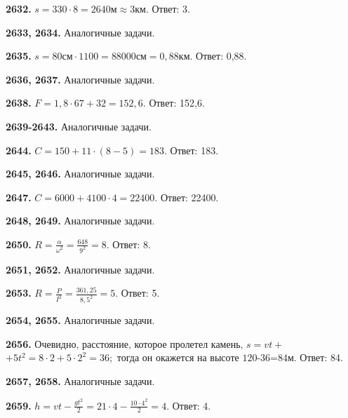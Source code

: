 \textbf{2632.} $s = 330 \cdot 8 = 2640\text{м}\approx 3\text{км.}$ \newline \null \hspace*{\fill} Ответ: 3. 

\textbf{2633, 2634.} Аналогичные задачи.

\textbf{2635.} $s = 80\text{см}\cdot 1100 = 88000\text{см}=0,88\text{км}.$\newline \null \hspace*{\fill} Ответ: 0,88. 

\textbf{2636, 2637.} Аналогичные задачи.

\textbf{2638.} $F = 1,8\cdot 67 + 32 = 152,6.$ \newline \null \hspace*{\fill} Ответ: 152,6. 

\textbf{2639-2643.} Аналогичные задачи.

\textbf{2644.} $C = 150 + 11\cdot (8 - 5) = 183.$\newline \null \hspace*{\fill} Ответ: 183. 

\textbf{2645, 2646.} Аналогичные задачи.

\textbf{2647.} $C = 6000 + 4100\cdot 4 = 22400.$\newline \null \hspace*{\fill} Ответ: 22400. 

\textbf{2648, 2649.} Аналогичные задачи.

\textbf{2650.} $R = \frac{\alpha}{\omega^2} = \frac{648}{9^2} = 8.$ \newline \null \hspace*{\fill} Ответ: 8. 

\textbf{2651, 2652.} Аналогичные задачи.

\textbf{2653.} $R = \frac{P}{I^2}=\frac{361,25}{8,5^2}=5.$\newline \null \hspace*{\fill} Ответ: 5. 

\textbf{2654, 2655.} Аналогичные задачи.

\textbf{2656.} $\text{Очевидно, расстояние, которое пролетел камень, } s = vt+$\newline$+ 5t^2= 8\cdot 2 + 5 \cdot 2^2 = 36; \text{ тогда он окажется на высоте 120-36=84м.}$\newline \null \hspace*{\fill} Ответ: 84. 

\textbf{2657, 2658.} Аналогичные задачи.

\textbf{2659.} $h = vt - \frac{gt^2}{2} = 21 \cdot 4 - \frac{10\cdot 4^2}{2}=4.$\newline \null \hspace*{\fill} Ответ: 4. 

